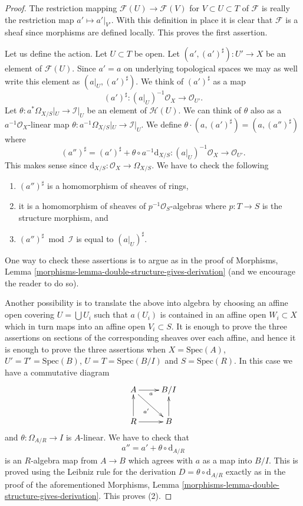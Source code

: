 \begin{proof}
The restriction mapping $\mathcal{F}(U) \to \mathcal{F}(V)$ for
$V \subset U \subset T$
of $\mathcal{F}$ is really the restriction map $a' \mapsto a'|_{V'}$.
With this definition in place it is clear that $\mathcal{F}$ is a
sheaf since morphisms are defined locally. This proves the first assertion.

\medskip\noindent
Let us define the action. Let $U \subset T$ be open. Let
$(a', (a')^\sharp) : U' \to X$ be an element of $\mathcal{F}(U)$.
Since $a' = a$ on underlying topological spaces we may as well
write this element as $(a|_U, (a')^\sharp)$. We think of $(a')^\sharp$
as a map
$$
(a')^\sharp : (a|_U)^{-1}\mathcal{O}_X \longrightarrow \mathcal{O}_{U'}.
$$
Let $\theta : a^*\Omega_{X/S}|_U \to \mathcal{I}|_U$ be an element of
$\mathcal{H}(U)$. We can think of $\theta$ also as a
$a^{-1}\mathcal{O}_X$-linear map
$\theta : a^{-1}\Omega_{X/S}|_U \to \mathcal{I}|_U$.
We define
$\theta \cdot (a, (a')^\sharp) = (a, (a'')^\sharp)$ where
$$
(a'')^\sharp = (a')^\sharp + \theta \circ a^{-1} \text{d}_{X/S} :
(a|_U)^{-1}\mathcal{O}_X \longrightarrow \mathcal{O}_{U'}.
$$
This makes sense since $\text{d}_{X/S} : \mathcal{O}_X \to \Omega_{X/S}$.
We have to check the following
\begin{enumerate}
\item $(a'')^\sharp$ is a homomorphism of sheaves of rings,
\item it is a homomorphism of sheaves of $p^{-1}\mathcal{O}_S$-algebras
where $p : T \to S$ is the structure morphism, and
\item $(a'')^\sharp \bmod \mathcal{I}$ is equal to $(a|_U)^\sharp$.
\end{enumerate}
One way to check these assertions is to argue as in the proof of
Morphisms, Lemma \ref{morphisms-lemma-double-structure-gives-derivation}
(and we encourage the reader to do so).

\medskip\noindent
Another possibility is to translate the above into algebra by choosing
an affine open covering $U = \bigcup U_i$ such that $a(U_i)$ is
contained in an affine open $W_i \subset X$ which in turn maps into an
affine open $V_i \subset S$. It is enough to prove the three assertions
on sections of the corresponding sheaves over each affine, and hence it
is enough to prove the three assertions
when $X = \text{Spec}(A)$, $U' = T' = \text{Spec}(B)$,
$U = T = \text{Spec}(B/I)$ and $S = \text{Spec}(R)$. In this case
we have a commutative diagram
$$
\xymatrix{
A \ar[r]_a \ar[rd]_{a'} & B/I \\
R \ar[r] \ar[u] & B \ar[u]
}
$$
and $\theta : \Omega_{A/R} \to I$ is $A$-linear. We have to check that
$$
a'' = a' + \theta \circ \text{d}_{A/R}
$$
is an $R$-algebra map from $A \to B$ which agrees with $a$ as a map into
$B/I$. This is proved using the Leibniz rule for the derivation
$D = \theta \circ \text{d}_{A/R}$ exactly as in the proof of the aforementioned
Morphisms, Lemma \ref{morphisms-lemma-double-structure-gives-derivation}.
This proves (2).


\end{proof}
